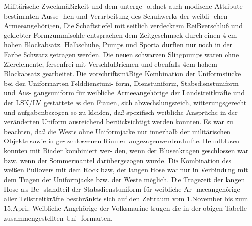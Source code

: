 Militärische Zweckmäßigkeit und dem unterge-
ordnet auch modische Attribute bestimmten Ausse-
hen und Verarbeitung des Schuhwerks der weibli-
chen Armeeangehörigen, Die Schaftstiefel mit
seitlich verdecktem ReiBverschluß und geklebter
Formgummisohle entsprachen dem Zeitgeschmack
durch einen 4 cm hohen Blockabsatz. Halbschuhe,
Pumps und Sporta durften nur noch in der Farbe
Schwarz getragen werden. Die neuen schwarzen
Slingpumps waren ohne Zierelemente, fersenfrei
mit VerschluBriemen und ebenfalls 4cm hohem
Blockabsatz gearbeitet.
Die vorschriftsmäBige Kombination der Uniformstücke bei den Uniformarten Felddienstuni-
form, Dienstuniform, Stabsdienstuniform und Aus-
gangsuniform für weibliche Armeeangehörige der
Landstreitkräfte und der LSK/LV gestattete es den
Frauen, sich abwechslungsreich, witterungsgerecht
und aufgabenbezogen so zu kleiden, daß spezifisch
weibliche Ansprüche in der veränderten Uniform
ausreichend berüicksichtigt werden konnten. Es war
zu beachten, daß die Weste ohne Uniformjacke nur
innerhalb der militärischen Objekte sowie in ge-
schlossenen Riumen angezogenwerdendurfte.
Hemdblusen konnten mit Binder kombiniert wer-
den, wenn der Blusenkragen geschlossen war bzw. wenn der Sommermantel darübergezogen wurde.
Die Kombination des weißen Pullovers mit dem
Rock bzw, der langen Hose war nur in Verbindung
mit dem Tragen der Uniformjacke bzw. der Weste
möglich. Die Tragezeit der langen Hose als Be-
standteil der Stabsdienstuniform für weibliche Ar-
meeangehörige aller Teilstreitkräfte beschränkte
sich auf den Zeitraum vom 1.November bis zum
15.April.
Weibliche Angehörige der Volksmarine trugen
die in der obigen Tabelle zusammengestellten Uni-
formarten.